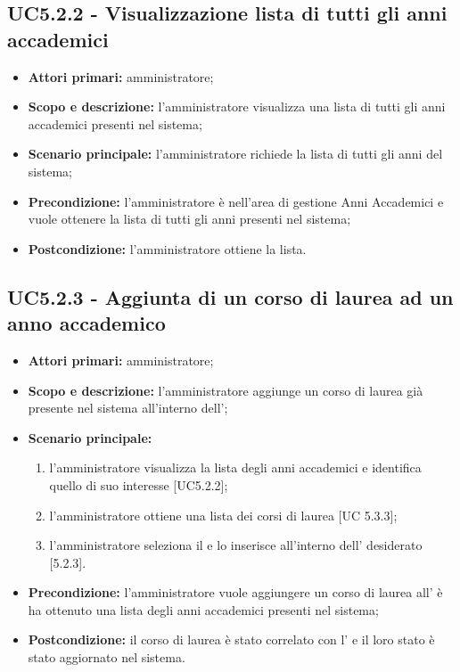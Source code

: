 \documentclass[AnalisiDeiRequisiti.tex]{subfiles}
\begin{document}
\subsection{UC5.2.2 - Visualizzazione lista di tutti gli anni accademici}
\begin{itemize}
	\item \textbf{Attori primari:} amministratore;
	\item \textbf{Scopo e descrizione:} l'amministratore visualizza una lista di tutti gli anni accademici presenti nel sistema;
	\item \textbf{Scenario principale:} l'amministratore richiede la lista di tutti gli anni del sistema;
	\item \textbf{Precondizione:} l'amministratore è nell'area di gestione Anni Accademici e vuole ottenere la lista di tutti gli anni presenti nel sistema; 
	\item \textbf{Postcondizione:} l'amministratore ottiene la lista.
\end{itemize}
\subsection{UC5.2.3 - Aggiunta di un corso di laurea ad un anno accademico}
\begin{itemize}
	\item \textbf{Attori primari:} amministratore;
	\item \textbf{Scopo e descrizione:} l'amministratore aggiunge un corso di laurea già presente nel sistema all'interno dell';
	\item \textbf{Scenario principale:}
	\begin{enumerate}
		\item l'amministratore visualizza la lista degli anni accademici e identifica quello di suo interesse [UC5.2.2];
		\item l'amministratore ottiene una lista dei corsi di laurea [UC 5.3.3];
		\item l'amministratore seleziona il  e lo inserisce all'interno dell' desiderato [5.2.3].
	\end{enumerate}
	\item \textbf{Precondizione:} l'amministratore vuole aggiungere un corso di laurea all' è ha ottenuto una lista degli anni accademici presenti nel sistema; 
	\item \textbf{Postcondizione:} il corso di laurea è stato correlato con l' e il loro stato è stato aggiornato nel sistema.
\end{itemize}
\end{document}

